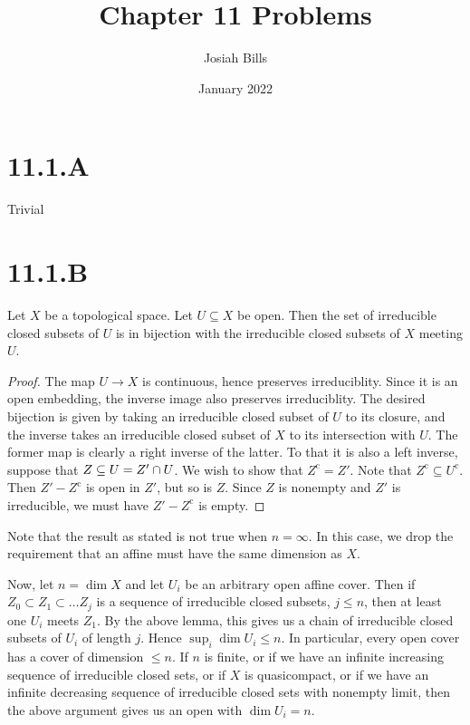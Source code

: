 \documentclass{article}
\title{Chapter 11 Problems}
\author{Josiah Bills}
\date{January 2022}
\begin{document}
\maketitle

\section{11.1.A}
Trivial

\section{11.1.B}
\begin{lemma}
    Let $X$ be a topological space. Let $U \subseteq X$ be
    open. Then the set of irreducible closed subsets of $U$ is in
    bijection with the irreducible closed subsets of $X$ meeting
    $U$.
\end{lemma}
\begin{proof}
    The map $U \to X$ is continuous, hence preserves irreduciblity.
    Since it is an open embedding, the inverse image also preserves irreduciblity.
    The desired bijection is given by taking an irreducible closed subset of
    $U$ to its closure, and the inverse takes an irreducible
    closed subset of $X$ to its intersection with
    $U$. The former map is clearly a right inverse of the latter.
    To that it is also a left inverse, suppose that $Z \subseteq U = Z' \cap U$. We wish
    to show that $Z^\text{c}=Z'$. Note that $Z^\text{c} \subseteq U^\text{c}$. Then
    $Z' - Z^\text{c}$ is open in $Z'$, but so is
    $Z$. Since $Z$ is nonempty and
    $Z'$ is irreducible, we must have $Z' - Z^\text{c}$ is
    empty.
\end{proof}

Note that the result as stated is not true when $n=\infty$. In this
case, we drop the requirement that an affine must have the same dimension as
$X$.

Now, let $n=\dim X$ and let $U_i$ be an arbitrary
open affine cover. Then if $Z_0 \subset Z_1 \subset \dots Z_j$ is a sequence of irreducible
closed subsets, $j \leq n$, then at least one
$U_i$ meets $Z_1$. By the above lemma, this
gives us a chain of irreducible closed subsets of $U_i$ of
length $j$. Hence $\sup_i \dim U_i \leq n$. In particular,
every open cover has a cover of dimension $\leq n$. If
$n$ is finite, or if we have an infinite increasing sequence
of irreducible closed sets, or if $X$ is quasicompact, or if
we have an infinite decreasing sequence of irreducible closed sets with
nonempty limit, then the above argument gives us an open with
$\dim U_i = n$.
\end{document}
